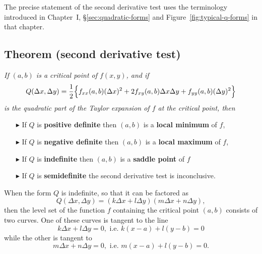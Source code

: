 The precise statement of the second derivative test uses the
terminology introduced in Chapter~I, \S\ref{sec:quadratic-forms} and Figure~\ref{fig:typical-q-forms} in that chapter.

\subsection*{Theorem (second derivative test)}\itshape  
If $(a, b)$ is a critical point of $f(x, y)$, and if 
\[
Q(\Delta x, \Delta y) = 
  \frac{1}{2}\Bigl\{
  f_{xx}(a, b)(\Delta x)^2 + 2f_{xy}(a,b)\Delta x \Delta y +
  f_{yy}(a,b)(\Delta y)^2
  \Bigr\}
\]
is the quadratic part of the Taylor expansion of $f$ at the critical
point, then 
\begin{itemize}
\item[$\blacktriangleright$] If $Q$ is \textbf{positive definite} then
  $(a,b)$ is a \textbf{local minimum} of $f$,
\item[$\blacktriangleright$] If $Q$ is \textbf{negative definite} then
  $(a,b)$ is a \textbf{local maximum} of $f$,
\item[$\blacktriangleright$] If $Q$ is \textbf{indefinite} then $(a,
  b)$ is a \textbf{saddle point} of $f$
\item[$\blacktriangleright$] If $Q$ is \textbf{semidefinite} the second
  derivative test is inconclusive.
\end{itemize}
\upshape
When the form $Q$ is indefinite, so that it can be factored as
\[
Q(\Delta x, \Delta y) = (k\Delta x + l\Delta y)(m\Delta x+n\Delta y),
\]
then the level set of the function $f$ containing the critical point
$(a, b)$ consists of two curves. One of these curves is tangent to the
line
\[
k\Delta x+l\Delta y = 0, \text{ i.e. } k(x-a) + l(y-b) = 0
\]
while the other is tangent to
\[
m\Delta x+n\Delta y = 0, \text{ i.e. } m(x-a) + l(y-b) = 0.
\]

